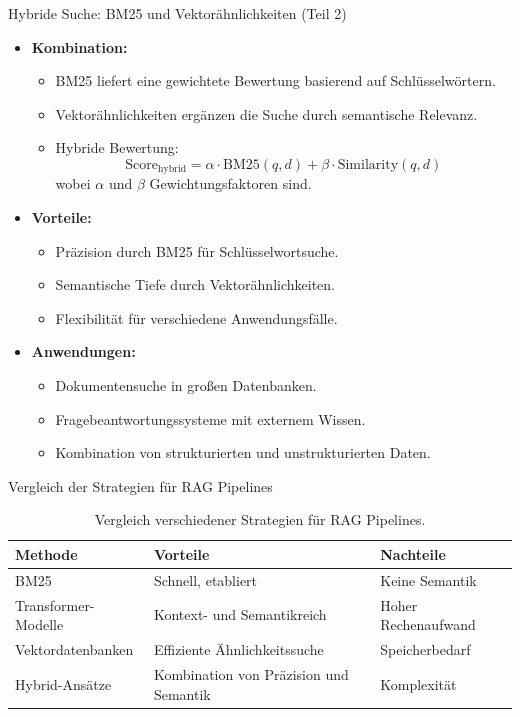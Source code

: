 \documentclass[aspectratio=1610, xcolor=dvipsnames, 9pt]{beamer}
\begin{document}
\begin{frame}{Hybride Suche: BM25 und Vektorähnlichkeiten (Teil 2)}
  \begin{itemize}
    \item \textbf{Kombination:}
      \begin{itemize}
        \item BM25 liefert eine gewichtete Bewertung basierend auf Schlüsselwörtern.
        \item Vektorähnlichkeiten ergänzen die Suche durch semantische Relevanz.
        \item Hybride Bewertung:
          \[
          \text{Score}_{\text{hybrid}} = \alpha \cdot \text{BM25}(q, d) + \beta \cdot \text{Similarity}(q, d)
          \]
          wobei \( \alpha \) und \( \beta \) Gewichtungsfaktoren sind.
      \end{itemize}
    \item \textbf{Vorteile:}
      \begin{itemize}
        \item Präzision durch BM25 für Schlüsselwortsuche.
        \item Semantische Tiefe durch Vektorähnlichkeiten.
        \item Flexibilität für verschiedene Anwendungsfälle.
      \end{itemize}
    \item \textbf{Anwendungen:}
      \begin{itemize}
        \item Dokumentensuche in großen Datenbanken.
        \item Fragebeantwortungssysteme mit externem Wissen.
        \item Kombination von strukturierten und unstrukturierten Daten.
      \end{itemize}
  \end{itemize}
\end{frame}

\begin{frame}{Vergleich der Strategien für RAG Pipelines}
  \begin{table}[]
    \centering
    \begin{tabular}{|l|l|l|}
      \hline
      \textbf{Methode} & \textbf{Vorteile} & \textbf{Nachteile} \\ \hline
      BM25 & Schnell, etabliert & Keine Semantik \\ \hline
      Transformer-Modelle & Kontext- und Semantikreich & Hoher Rechenaufwand \\ \hline
      Vektordatenbanken & Effiziente Ähnlichkeitssuche & Speicherbedarf \\ \hline
      Hybrid-Ansätze & Kombination von Präzision und Semantik & Komplexität \\ \hline
    \end{tabular}
    \caption{Vergleich verschiedener Strategien für RAG Pipelines.}
  \end{table}
\end{frame}
\end{document}
